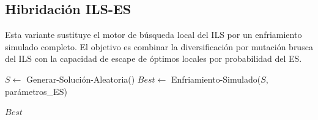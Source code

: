 \subsection{Hibridación ILS-ES}

Esta variante sustituye el motor de búsqueda local del ILS por un enfriamiento 
simulado completo. El objetivo es combinar la diversificación por mutación 
brusca del ILS con la capacidad de escape de óptimos locales por probabilidad 
del ES.

\begin{algorithm}[H]
\SetAlgoLined
{}

$S \leftarrow$ Generar-Solución-Aleatoria()\;
$Best \leftarrow$ Enfriamiento-Simulado($S$, parámetros\_ES)\;

\Return $Best$\;
\caption{Hibridación ILS-ES}
\label{alg:ils-es}
\end{algorithm}
